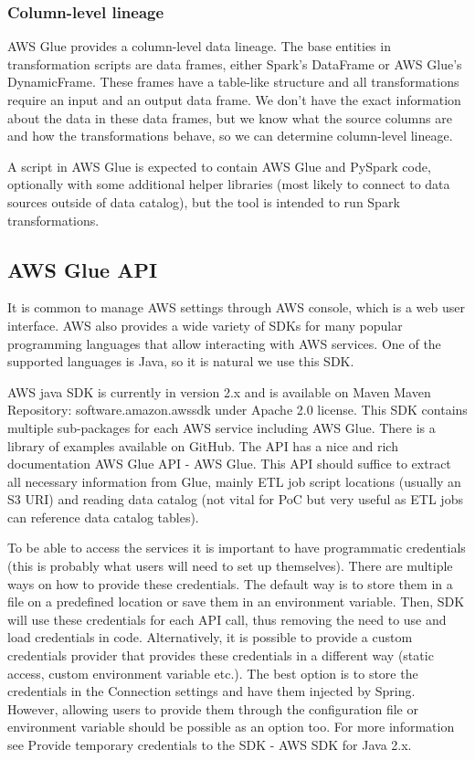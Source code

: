 \subsubsection{Column-level lineage}
AWS Glue provides a column-level data lineage. The base entities in transformation scripts are data frames, either Spark’s DataFrame or AWS Glue’s DynamicFrame. These frames have a table-like structure and all transformations require an input and an output data frame. We don’t have the exact information about the data in these data frames, but we know what the source columns are and how the transformations behave, so we can determine column-level lineage.

A script in AWS Glue is expected to contain AWS Glue and PySpark code, optionally with some additional helper libraries (most likely to connect to data sources outside of data catalog), but the tool is intended to run Spark transformations.

\subsection{AWS Glue API}
It is common to manage AWS settings through AWS console, which is a web user interface. AWS also provides a wide variety of SDKs for many popular programming languages that allow interacting with AWS services. One of the supported languages is Java, so it is natural we use this SDK. 

AWS java SDK is currently in version 2.x and is available on Maven Maven Repository: software.amazon.awssdk under Apache 2.0 license. This SDK contains multiple sub-packages for each AWS service including AWS Glue. There is a library of examples available on GitHub. The API has a nice and rich documentation AWS Glue API - AWS Glue. This API should suffice to extract all necessary information from Glue, mainly ETL job script locations (usually an S3 URI) and reading data catalog (not vital for PoC but very useful as ETL jobs can reference data catalog tables).

To be able to access the services it is important to have programmatic credentials (this is probably what users will need to set up themselves). There are multiple ways on how to provide these credentials. The default way is to store them in a file on a predefined location or save them in an environment variable. Then, SDK will use these credentials for each API call, thus removing the need to use and load credentials in code. Alternatively, it is possible to provide a custom credentials provider that provides these credentials in a different way (static access, custom environment variable etc.). The best option is to store the credentials in the Connection settings and have them injected by Spring. However, allowing users to provide them through the configuration file or environment variable should be possible as an option too. For more information see Provide temporary credentials to the SDK - AWS SDK for Java 2.x. 


